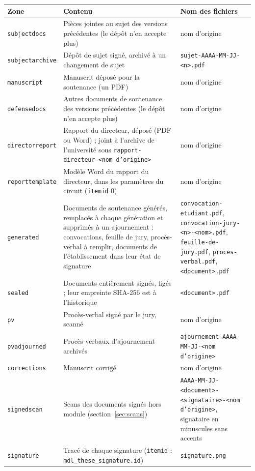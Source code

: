 \documentclass[11pt,a4paper]{article}
\begin{document}
\begin{center}
\footnotesize
\begin{tabularx}{\linewidth}{@{}l X X@{}}
\toprule
\textbf{Zone} & \textbf{Contenu} & \textbf{Nom des fichiers} \\
\midrule
\texttt{subjectdocs} & Pièces jointes au sujet des versions précédentes (le dépôt n'en accepte plus) & nom d'origine \\
\texttt{subjectarchive} & Dépôt de sujet signé, archivé à un changement de sujet
& \texttt{sujet-AAAA-MM-JJ-<n>.pdf} \\
\texttt{manuscript} & Manuscrit déposé pour la soutenance (un PDF) & nom d'origine \\
\texttt{defensedocs} & Autres documents de soutenance des versions précédentes (le dépôt n'en accepte plus) & nom d'origine \\
\texttt{directorreport} & Rapport du directeur, déposé (PDF ou Word) ; joint
à l'archive de l'université sous \texttt{rapport-directeur-<nom d'origine>} & nom d'origine \\
\texttt{reporttemplate} & Modèle Word du rapport du directeur, dans les
paramètres du circuit (\texttt{itemid} 0) & nom d'origine \\
\texttt{generated} & Documents de soutenance générés, remplacés à chaque
génération et supprimés à un ajournement : convocations, feuille de jury,
procès-verbal à remplir, documents de l'établissement dans leur état de
signature & \texttt{convocation-etudiant.pdf},
\texttt{convocation-jury-<n>-<nom>.pdf}, \texttt{feuille-de-jury.pdf},
\texttt{proces-verbal.pdf}, \texttt{<document>.pdf} \\
\texttt{sealed} & Documents entièrement signés, figés ; leur empreinte SHA-256
est à l'historique & \texttt{<document>.pdf} \\
\texttt{pv} & Procès-verbal signé par le jury, scanné & nom d'origine \\
\texttt{pvadjourned} & Procès-verbaux d'ajournement archivés &
\texttt{ajournement-AAAA-MM-JJ-<nom d'origine>} \\
\texttt{corrections} & Manuscrit corrigé & nom d'origine \\
\texttt{signedscan} & Scans des documents signés hors module
(section~\ref{sec:scans}) &
\texttt{AAAA-MM-JJ-<document>-<signataire>-<nom d'origine>}, signataire en
minuscules sans accents \\
\texttt{signature} & Tracé de chaque signature (\texttt{itemid} :
\texttt{mdl\_these\_signature.id}) & \texttt{signature.png} \\
\bottomrule
\end{tabularx}
\end{center}
\end{document}
